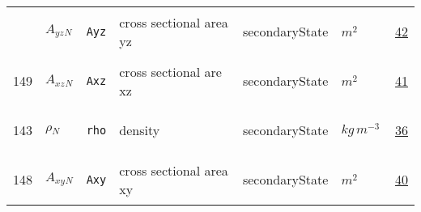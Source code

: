 \begin{longtable}{|p{1cm}|p{2.5cm}|p{4.5cm}|p{8cm}|p{3.0cm}|p{3cm}|p{1cm}|}
             & \hypertarget{"v:150"}{ $ {{A_{yz}}}{_{N}} $}
             & \verb|Ayz|
             & cross sectional area yz
             & \begin{lay}secondaryState \end{lay}
             & $ m^{2} \, $
             &                 \hyperlink{"e:42"}{ 42 }
                 \\
            149
             & \hypertarget{"v:149"}{ $ {{A_{xz}}}{_{N}} $}
             & \verb|Axz|
             & cross sectional are xz
             & \begin{lay}secondaryState \end{lay}
             & $ m^{2} \, $
             &                 \hyperlink{"e:41"}{ 41 }
                 \\
            143
             & \hypertarget{"v:143"}{ $ {{\rho}}{_{N}} $}
             & \verb|rho|
             & density
             & \begin{lay}secondaryState \end{lay}
             & $ kg \,m^{-3} \, $
             &                 \hyperlink{"e:36"}{ 36 }
                 \\
            148
             & \hypertarget{"v:148"}{ $ {{A_{xy}}}{_{N}} $}
             & \verb|Axy|
             & cross sectional area xy
             & \begin{lay}secondaryState \end{lay}
             & $ m^{2} \, $
             &                 \hyperlink{"e:40"}{ 40 }
                 \\
    \end{longtable}